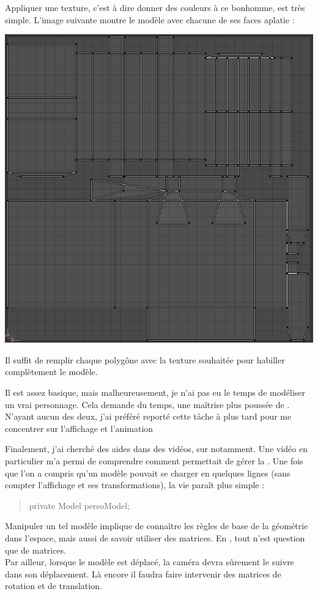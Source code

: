 \documentclass{article}
\begin{document}
Appliquer une texture, c'est à dire donner des couleurs à ce bonhomme, est très simple. L'image suivante montre le modèle  avec chacune de ses faces aplatie : 
 \begin{center}
\includegraphics[scale=0.5]{UVmapping}
\end{center}
Il suffit de remplir chaque polygône avec la texture souhaitée pour habiller complètement le modèle.

Il est assez basique, mais malheureusement, je n'ai pas eu le temps de modéliser un vrai personnage. Cela demande du temps, une maîtrise plus poussée de . N'ayant aucun des deux, j'ai préféré reporté cette tâche à plus tard pour me concentrer sur l'affichage et l'animation 

Finalement, j'ai cherché des aides dans des vidéos, sur  notamment. Une vidéo en particulier m'a permi de comprendre comment  permettait de gérer la . Une fois que l'on a compris qu'un modèle  pouvait se charger en quelques lignes (sans compter l'affichage et ses transformations), la vie paraît plus simple : \begin{quote}
private Model persoModel;
\end{quote}

Manipuler un tel modèle implique de connaître les règles de base de la géométrie dans l'espace, mais aussi de savoir utiliser des matrices. En , tout n'est question que de matrices. \\
Par ailleur, lorsque le modèle est déplacé, la caméra devra sûrement le suivre dans son déplacement. Là encore il faudra faire intervenir des matrices de rotation et de translation.
\end{document}
